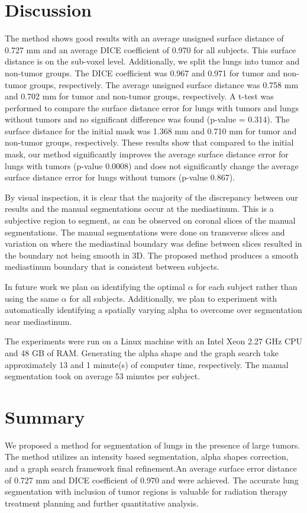 \documentclass{llncs}
\begin{document}
%
\section{Discussion}
%

The method shows good results with an average unsigned surface distance of 0.727 mm and an average DICE coefficient of 0.970 for all subjects. This surface distance is on the sub-voxel level. Additionally, we split the lungs into tumor and non-tumor groups. The DICE coefficient was 0.967 and 0.971 for tumor and non-tumor groups, respectively. The average unsigned surface distance was 0.758 mm and 0.702 mm for tumor and non-tumor groups, respectively. A t-test was performed to compare the surface distance error for lungs with tumors and lungs without tumors and no significant difference was found (p-value = 0.314). The surface distance for the initial mask was 1.368 mm and 0.710 mm for tumor and non-tumor groups, respectively. These results show that compared to the initial mask, our method significantly improves the average surface distance error for lungs with tumors (p-value 0.0008) and does not significantly change the average surface distance error for lungs without tumors (p-value 0.867).

By visual inspection, it is clear that the majority of the discrepancy between our results and the manual segmentations occur at the mediastinum. This is a subjective region to segment, as can be observed on coronal slices of the manual segmentations. The manual segmentations were done on transverse slices and variation on where the mediastinal boundary was define between slices resulted in the boundary not being smooth in 3D. The proposed method produces a smooth mediastinum boundary that is consistent between subjects. 

In future work we plan on identifying the optimal $\alpha$ for each subject rather than using the same $\alpha$ for all subjects. Additionally, we plan to experiment with automatically identifying a spatially varying alpha to overcome over segmentation near mediastinum.

The experiments were run on a Linux machine with an Intel Xeon 2.27 GHz CPU and 48 GB of RAM. Generating the alpha shape and the graph search take approximately 13 and 1 minute(s) of computer time, respectively. The manual segmentation took on average 53 minutes per subject.
%
\section{Summary}
%
We proposed a method for segmentation of lungs in the presence of large tumors. The method utilizes an intensity based segmentation, alpha shapes correction, and a graph search framework final refinement.An average surface error distance of 0.727 mm and DICE coefficient of 0.970 and  were achieved. The accurate lung segmentation with  inclusion of tumor regions is valuable for radiation therapy treatment planning and further quantitative analysis.
%
\end{document}
